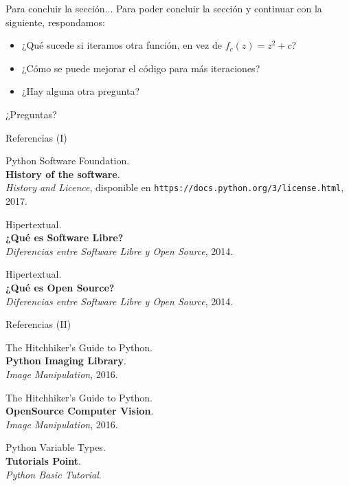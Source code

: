 \documentclass[usenames,dvipsnames]{beamer}
\begin{document}
  \begin{frame}{Para concluir la sección...}
    Para poder concluir la sección y continuar con la siguiente,
    respondamos:
    \begin{itemize}
      \item ¿Qué sucede si iteramos otra función, en vez de
      $f_c(z) = z^2 + c$?
      \item ¿Cómo se puede mejorar el código para más iteraciones?
      \item ¿Hay alguna otra pregunta?
    \end{itemize}
  \end{frame}

  \begin{frame}[standout]
    ¿Preguntas?
  \end{frame}

  \begin{frame}{Referencias (I)}
    \begin{enumerate}[{[}1{]}]
      \item Python Software Foundation.\\
      \textbf{History of the software}.\\
      \textit{History and Licence},
      disponible en \texttt{https://docs.python.org/3/license.html}, 2017.

      \item Hipertextual.\\
      \textbf{¿Qué es Software Libre?}\\
      \textit{Diferencias entre Software Libre y Open Source}, 2014.

      \item Hipertextual.\\
      \textbf{¿Qué es Open Source?}\\
      \textit{Diferencias entre Software Libre y Open Source}, 2014.
    \end{enumerate}
  \end{frame}

  \begin{frame}{Referencias (II)}
    \begin{enumerate}[{[}1{]}]
      \addtocounter{enumi}{3}

      \item The Hitchhiker's Guide to Python.\\
      \textbf{Python Imaging Library}.\\
      \textit{Image Manipulation}, 2016.

      \item The Hitchhiker's Guide to Python.\\
      \textbf{OpenSource Computer Vision}.\\
      \textit{Image Manipulation}, 2016.

      \item Python Variable Types.\\
      \textbf{Tutorials Point}.\\
      \textit{Python Basic Tutorial}.
    \end{enumerate}
  \end{frame}
\end{document}
